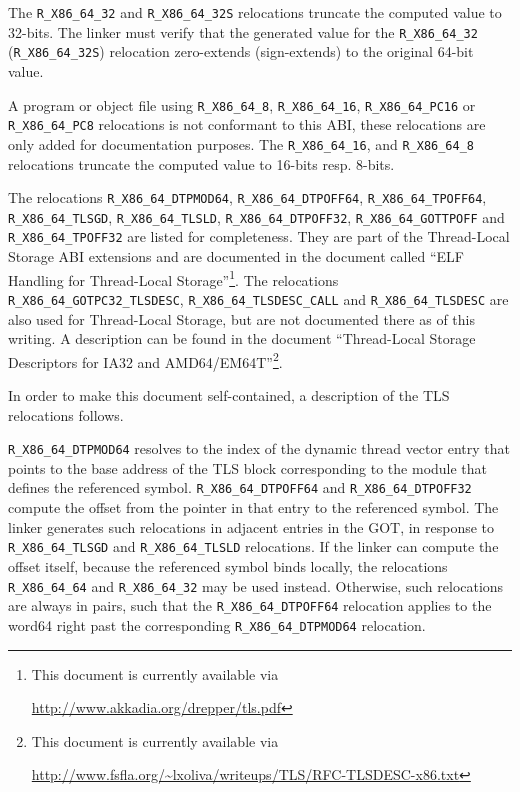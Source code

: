 \begin{sloppypar}
The \texttt{R_X86_64_32} and \texttt{R_X86_64_32S} relocations truncate
the computed value to 32-bits.  The linker must verify that the
generated value for the \texttt{R_X86_64_32} (\texttt{R_X86_64_32S})
relocation zero-extends (sign-extends) to the original 64-bit value.
\end{sloppypar}

\begin{sloppypar}
A program or object file using \texttt{R_X86_64_8},
\texttt{R_X86_64_16}, \texttt{R_X86_64_PC16} or \texttt{R_X86_64_PC8}
relocations is not conformant to this ABI, these relocations are only
added for documentation purposes.  The \texttt{R_X86_64_16}, and
\texttt{R_X86_64_8} relocations truncate the computed value to 16-bits
resp. 8-bits.
\end{sloppypar}

\begin{sloppypar}
The relocations \texttt{R_X86_64_DTPMOD64},
\texttt{R_X86_64_DTPOFF64}, \texttt{R_X86_64_TPOFF64},
\texttt{R_X86_64_TLSGD}, \texttt{R_X86_64_TLSLD},
\texttt{R_X86_64_DTPOFF32}, \texttt{R_X86_64_GOTTPOFF} and
\texttt{R_X86_64_TPOFF32} are listed for completeness.  They are part
of the Thread-Local Storage ABI extensions and are documented in the
document called ``ELF Handling for Thread-Local
Storage''\footnote{This document is currently available via
  \raggedright\url{http://www.akkadia.org/drepper/tls.pdf}}.  The relocations \texttt{R_X86_64_GOTPC32_TLSDESC},
\texttt{R_X86_64_TLSDESC_CALL} and \texttt{R_X86_64_TLSDESC} are also
used for Thread-Local Storage, but are not documented there as of this
writing.  A description can be found in the document ``Thread-Local
Storage Descriptors for IA32 and AMD64/EM64T''\footnote{This document
  is currently available via
  \raggedright\url{http://www.fsfla.org/~lxoliva/writeups/TLS/RFC-TLSDESC-x86.txt}}.
\end{sloppypar}

In order to make this document self-contained, a description of the
TLS relocations follows.

\begin{sloppypar}
\texttt{R_X86_64_DTPMOD64} resolves to the index of the dynamic thread
vector entry that points to the base address of the TLS block
corresponding to the module that defines the referenced symbol.
\texttt{R_X86_64_DTPOFF64} and \texttt{R_X86_64_DTPOFF32} compute the
offset from the pointer in that entry to the referenced symbol.  The
linker generates such relocations in adjacent entries in the GOT, in
response to \texttt{R_X86_64_TLSGD} and \texttt{R_X86_64_TLSLD}
relocations.  If the linker can compute the offset itself, because the
referenced symbol binds locally, the relocations \texttt{R_X86_64_64} and \texttt{R_X86_64_32} may be used instead.
Otherwise, such relocations are always in pairs, such that the
\texttt{R_X86_64_DTPOFF64} relocation applies to the word64 right past the
corresponding \texttt{R_X86_64_DTPMOD64} relocation.
\end{sloppypar}

